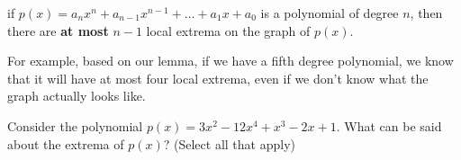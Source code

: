 \documentclass{ximeraXloud}
\begin{document}
\begin{lemma}
if $p(x) = a_nx^n + a_{n-1}x^{n-1} + \dots + a_1 x + a_0$ is a polynomial of degree $n$, then there are \textbf{at most} $n-1$ local extrema on the graph of $p(x)$.
\end{lemma}

For example, based on our lemma, if we have a fifth degree polynomial, we know that it will have at most four local extrema, even if we don't know what the graph actually looks like. 

\begin{problem}
    Consider the polynomial $p(x) = 3x^2 -12 x^4 + x^3 - 2x + 1$. What can be said about the extrema of $p(x)$? (Select all that apply)
    \begin{selectAll}
    \end{selectAll}
\end{problem}
\end{document}
